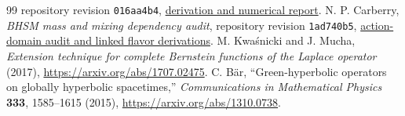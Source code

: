 \documentclass[11pt]{article}
\begin{document}
\begin{thebibliography}{99}
repository revision \texttt{016aa4b4},
\href{https://github.com/ncarberry64/Berger-Hopf-Standard-Model/blob/016aa4b48a87dcb53cdf50a05e9010d9777d208c/theory/ae3_c2_photon_symbol_audit.md}{derivation and numerical report}.
 N. P. Carberry, \emph{BHSM mass and mixing
dependency audit}, repository revision \texttt{1ad740b5},
\href{https://github.com/ncarberry64/Berger-Hopf-Standard-Model/blob/1ad740b5ada806e3c5845a379c62d7f29712c6ff/docs/BHSM_MASS_MIXING_DEPENDENCY_AUDIT_2026_09_07.md}{action-domain audit and linked flavor derivations}.
 M. Kwa\'snicki and J. Mucha, \emph{Extension technique
for complete Bernstein functions of the Laplace operator} (2017),
\url{https://arxiv.org/abs/1707.02475}.
 C. B\"ar, ``Green-hyperbolic operators on globally hyperbolic
spacetimes,'' \emph{Communications in Mathematical Physics} \textbf{333},
1585--1615 (2015), \url{https://arxiv.org/abs/1310.0738}.
\end{thebibliography}
\end{document}
